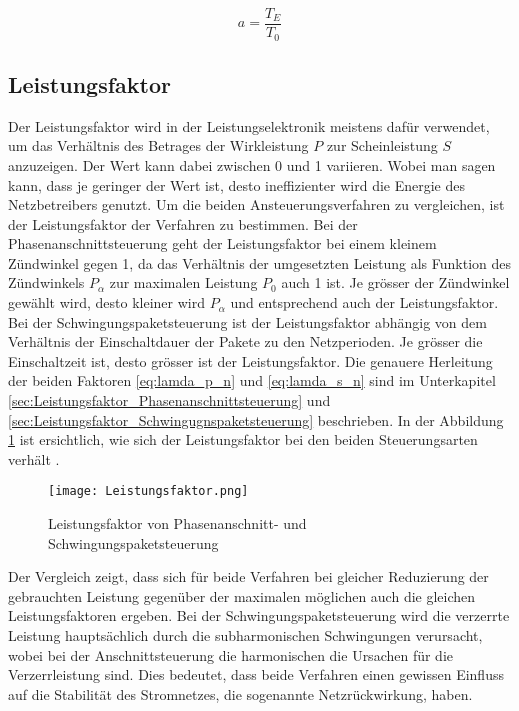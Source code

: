 \begin{equation}\label{eq:Einschaltverhältnis}
a = \frac{T_E}{T_0}
\end{equation}

\subsection{Leistungsfaktor}\label{sec:Leistungsfaktor}
Der Leistungsfaktor wird in der Leistungselektronik meistens dafür verwendet, um das Verhältnis des Betrages der Wirkleistung $P$ zur Scheinleistung $S$ anzuzeigen. Der Wert kann dabei zwischen 0 und 1 variieren. Wobei man sagen kann, dass je geringer der Wert ist, desto ineffizienter wird die Energie des Netzbetreibers genutzt. Um die beiden Ansteuerungsverfahren zu vergleichen, ist der Leistungsfaktor der Verfahren zu bestimmen. Bei der Phasenanschnittsteuerung geht der Leistungsfaktor bei einem kleinem Zündwinkel gegen 1, da das Verhältnis der umgesetzten Leistung als Funktion des Zündwinkels $P_{\alpha}$ zur maximalen Leistung $P_0$ auch 1 ist. Je grösser der Zündwinkel gewählt wird, desto kleiner wird $P_{\alpha}$ und entsprechend auch der Leistungsfaktor. Bei der Schwingungspaketsteuerung ist der Leistungsfaktor abhängig von dem Verhältnis der Einschaltdauer der Pakete zu den Netzperioden. Je grösser die Einschaltzeit ist, desto grösser ist der Leistungsfaktor. Die genauere Herleitung der beiden Faktoren \ref{eq:lamda_p_n} und \ref{eq:lamda_s_n} sind im Unterkapitel \ref{sec:Leistungsfaktor_Phasenanschnittsteuerung} und \ref{sec:Leistungsfaktor_Schwingugnspaketsteuerung} beschrieben. In der Abbildung \ref{fig:Leistungsfaktor} ist ersichtlich, wie sich der Leistungsfaktor bei den beiden Steuerungsarten verhält \cite{Leistungselektronik}.

\begin{figure}[ht!]
	\centering
	\texttt{[image: Leistungsfaktor.png]}	
	\caption{Leistungsfaktor von Phasenanschnitt- und Schwingungspaketsteuerung}\label{fig:Leistungsfaktor}
\end{figure}

Der Vergleich zeigt, dass sich für beide Verfahren bei gleicher Reduzierung der gebrauchten Leistung gegenüber der maximalen möglichen auch die gleichen Leistungsfaktoren ergeben. Bei der Schwingungspaketsteuerung wird die verzerrte Leistung hauptsächlich durch die subharmonischen Schwingungen verursacht, wobei bei der Anschnittsteuerung die harmonischen die Ursachen für die Verzerrleistung sind. Dies bedeutet, dass beide Verfahren einen gewissen Einfluss auf die Stabilität des Stromnetzes, die sogenannte Netzrückwirkung, haben.
\newpage
